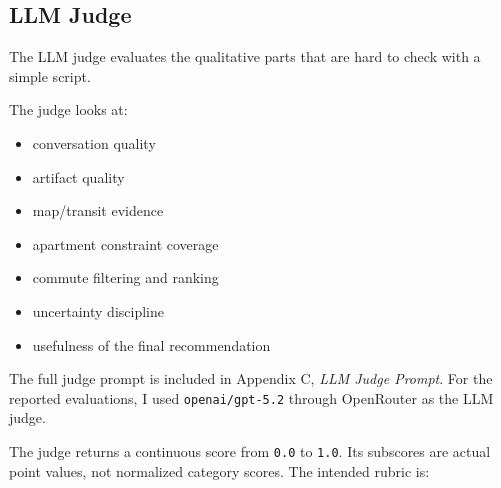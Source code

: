 \documentclass[11pt]{article}
\begin{document}
\subsection{LLM Judge}

The LLM judge evaluates the qualitative parts that are hard to check with a
simple script.

The judge looks at:

\begin{itemize}
  \item conversation quality
  \item artifact quality
  \item map/transit evidence
  \item apartment constraint coverage
  \item commute filtering and ranking
  \item uncertainty discipline
  \item usefulness of the final recommendation
\end{itemize}

The full judge prompt is included in Appendix C, \textit{LLM Judge Prompt}. For
the reported evaluations, I used \texttt{openai/gpt-5.2} through OpenRouter as
the LLM judge.

The judge returns a continuous score from \texttt{0.0} to \texttt{1.0}. Its
subscores are actual point values, not normalized category scores. The intended
rubric is:
\end{document}
